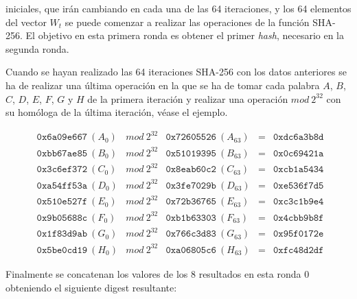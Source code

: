 \documentclass{article}
\begin{document}
        
        
        \noindent iniciales, que irán cambiando en cada una de las 64 iteraciones, y los 64 elementos del vector $W_t$ se puede comenzar a realizar las operaciones de la función SHA-256. El objetivo en esta primera ronda es obtener el primer \textit{hash}, necesario en la segunda ronda.
        
        \vspace{3mm}
        
        Cuando se hayan realizado las 64 iteraciones SHA-256 con los datos anteriores se ha de realizar una última operación en la que se ha de tomar cada palabra $A$, $B$, $C$, $D$, $E$, $F$, $G$ y $H$ de la primera iteración y realizar una operación $mod\ 2^{32}$ con su homóloga de la última iteración, véase el ejemplo.
        
        \begin{figure}[H]
        \centering
            $\begin{array}{lllll}
                \texttt{0x6a09e667}\ (A_{0}) & mod\ 2^{32} & \texttt{0x72605526}\ (A_{63}) & = & \texttt{0xdc6a3b8d} \\
                \texttt{0xbb67ae85}\ (B_{0}) & mod\ 2^{32} & \texttt{0x51019395}\ (B_{63}) & = & \texttt{0x0c69421a} \\
                \texttt{0x3c6ef372}\ (C_{0}) & mod\ 2^{32} & \texttt{0x8eab60c2}\ (C_{63}) & = & \texttt{0xcb1a5434} \\
                \texttt{0xa54ff53a}\ (D_{0}) & mod\ 2^{32} & \texttt{0x3fe7029b}\ (D_{63}) & = & \texttt{0xe536f7d5} \\
                \texttt{0x510e527f}\ (E_{0}) & mod\ 2^{32} & \texttt{0x72b36765}\ (E_{63}) & = & \texttt{0xc3c1b9e4} \\
                \texttt{0x9b05688c}\ (F_{0}) & mod\ 2^{32} & \texttt{0xb1b63303}\ (F_{63}) & = & \texttt{0x4cbb9b8f} \\
                \texttt{0x1f83d9ab}\ (G_{0}) & mod\ 2^{32} & \texttt{0x766c3d83}\ (G_{63}) & = & \texttt{0x95f0172e} \\
                \texttt{0x5be0cd19}\ (H_{0}) & mod\ 2^{32} & \texttt{0xa06805c6}\ (H_{63}) & = & \texttt{0xfc48d2df}
            \end{array}$
        \end{figure}
        
        Finalmente se concatenan los valores de los 8 resultados en esta ronda 0 obteniendo el siguiente digest resultante:
        
\end{document}

